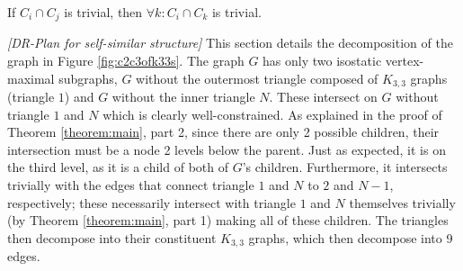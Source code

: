 \begin{lemma}\label{lemma:uc_intersection_makes_all_uc}
If $C_i\cap C_j$ is trivial, then $\forall k: C_i\cap C_k$ is trivial.
\end{lemma}







\begin{figure*}\centering
\begin{subfigure}{.3\linewidth}\centering
    
    \caption{}\label{fig:c2c3ofk33s:a}
\end{subfigure}%
\begin{subfigure}{.7\linewidth}\centering
    
    \caption{}\label{fig:c2c3ofk33s:b}
\end{subfigure}

\caption{(\ref{fig:c2c3ofk33s:a}) A doublet ($C_2 \times C_3$) with each edge of the triangles replaced by a $K_{3,3}$. This pattern continues inwards for a total of $N$ triangles, indicated by the dashed lines. (\ref{fig:c2c3ofk33s:b}) Most of the DR-plan of this graph, omitting further decomposition of $K_{3,3}$ subgraphs into the separate 9 edges and of edges into the component nodes. $G\setminus\{a_i,b_i,c_i\}$ is shorthand for $G$ difference those nodes and all of the nodes in the corresponding $K_{3,3}$ subgraphs. The dashed lines indicated that this exact structure is repeated.}
\label{fig:c2c3ofk33s}
\end{figure*}

\myexample
\textsl{[DR-Plan for self-similar structure]}
This section details the decomposition of the graph in Figure \ref{fig:c2c3ofk33s}. The graph $G$ has only two isostatic vertex-maximal subgraphs, $G$ without the outermost triangle composed of $K_{3,3}$ graphs (triangle $1$) and $G$ without the inner triangle $N$. These intersect on $G$ without triangle $1$ and $N$ which is clearly well-constrained. As explained in the proof of Theorem \ref{theorem:main}, part 2, since there are only 2 possible children, their intersection must be a node 2 levels below the parent. Just as expected, it is on the third level, as it is a child of both of $G$'s children. Furthermore, it intersects trivially with the edges that connect triangle $1$ and $N$ to $2$ and $N-1$, respectively; these necessarily intersect with triangle $1$ and $N$ themselves trivially (by Theorem \ref{theorem:main}, part 1) making all of these children. The triangles then decompose into their constituent $K_{3,3}$ graphs, which then decompose into 9 edges.

